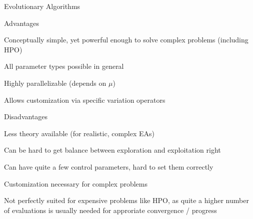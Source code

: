 \begin{frame}{Evolutionary Algorithms}

  \begin{blocki}{Advantages}
    \item Conceptually simple, yet powerful enough to solve complex problems (including HPO)
    \item All parameter types possible in general
    \item Highly parallelizable (depends on $\mu$)
    \item Allows customization via specific variation operators
    \end{blocki}

    \begin{blocki}{Disadvantages}
      \item Less theory available (for realistic, complex EAs)
    \item Can be hard to get balance between exploration and exploitation right
        \item Can have quite a few control parameters, hard to set them correctly\\
        \item Customization necessary for complex problems
        \item Not perfectly suited for expensive problems like HPO, 
            as quite a higher number of evaluations is usually
            needed for approriate convergence / progress
    \end{blocki}

\end{frame}







